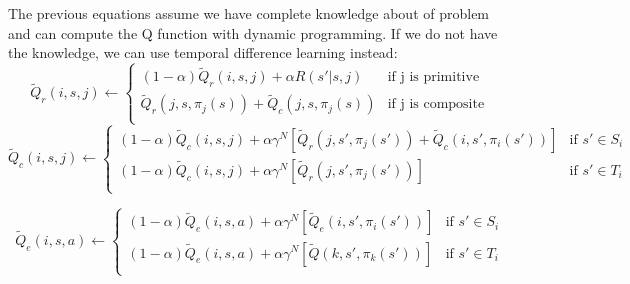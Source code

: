 \documentclass{article} %
\begin{document}
The previous equations assume we have complete knowledge about of problem and can compute
the Q function with dynamic programming. If we do not have the knowledge, we can
use temporal difference learning instead:
\begin{equation}
    \tilde{Q}_r(i, s, j) \leftarrow
    \left\{\begin{array}{ll}
    (1 - \alpha)\tilde{Q}_r(i, s, j) + \alpha R(s'| s, j)  & \mbox{if j is primitive} \\
    \tilde{Q}_r(j, s, \pi_j(s)) + \tilde{Q}_c(j, s, \pi_j(s)) & \mbox{if j is composite} \\
    \end{array} \right.
    \label{eq:TdQr}
\end{equation}
\begin{equation}
    \tilde{Q}_c(i, s, j) \leftarrow
    \left\{\begin{array}{ll}
    (1 - \alpha)\tilde{Q}_c(i, s, j) + \alpha \gamma^N[\tilde{Q}_r(j, s', \pi_j(s')) + \tilde{Q}_c(i, s', \pi_i(s'))]  & \mbox{if $s' \in S_i$} \\
    (1 - \alpha)\tilde{Q}_c(i, s, j) + \alpha \gamma^N[\tilde{Q}_r(j, s', \pi_j(s'))]  & \mbox{if $s' \in T_i$} \\
    \end{array} \right.
    \label{eq:TdQc}
\end{equation}

\begin{equation}
    \tilde{Q}_e(i, s, a) \leftarrow 
    \left\{\begin{array}{ll}
        (1 - \alpha)\tilde{Q}_e(i, s, a) + \alpha \gamma^N[\tilde{Q}_e(i, s', \pi_i(s'))] & \mbox{if $s' \in S_i$} \\
        (1 - \alpha)\tilde{Q}_e(i, s, a) + \alpha \gamma^N[\tilde{Q}(k, s', \pi_k(s'))] & \mbox{if $s' \in T_i$} \\
    \end{array} \right.
    \label{eq:TdQe}
\end{equation}
\end{document}
